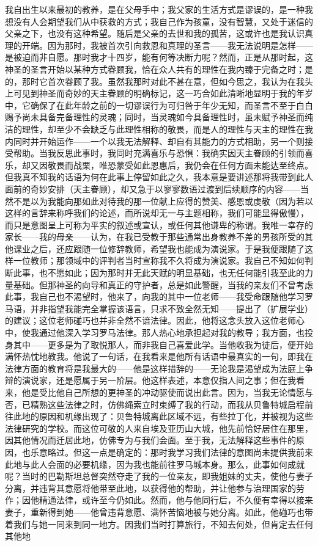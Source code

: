 我自出生以来最初的教养，是在父母手中；我父家的生活方式是谬误的，是一种我想没有人会期望我们从中获救的方式；我自己作为孩童，没有智慧，又处于迷信的父亲之下，也没有这种希望。随后是父亲的去世和我的孤苦，这或许也是我认识真理的开端。因为那时，我被首次引向救恩和真理的圣言——我无法说明是怎样——是被迫而非自愿。那时我才十四岁，能有何等决断力呢？然而，正是从那时起，这神圣的圣言开始以某种方式眷顾我，恰在众人共有的理性在我内臻于完备之时；是的，那时它首次眷顾了我。虽然我那时对此不甚在意，但如今思之，我认为在我头上可见到神圣而奇妙的天主眷顾的明确标记，这一巧合如此清晰地显明于我的年岁中，它确保了在此年龄之前的一切谬误行为可归咎于年少无知，而圣言不至于白白赐予尚未具备完备理性的灵魂；同时，当灵魂如今具备理性时，虽未赋予神圣而纯洁的理性，却至少不会缺乏与此理性相称的敬畏，而是人的理性与天主的理性在我内同时并开始运作——一个以我无法解释、却自有其能力的方式相助，另一个则接受帮助。当我反思此事时，我同时充满喜乐与恐惧：我确实因天主眷顾的引领而喜乐，却又因敬畏而战栗，唯恐蒙受如此恩惠后，我仍会在任何方面未能达至终点。但我真不知我的话语为何在此事上停留如此之久，我本意是要讲述那将我带到此人面前的奇妙安排（天主眷顾），却又急于以寥寥数语过渡到后续顺序的内容——当然不是以为我能向那如此对待我的那一位献上应得的赞美、感恩或虔敬（因为若以这样的言辞来称呼我们的论述，而所说却无一与主题相称，我们可能显得傲慢），而只是意图呈上可称为平实的叙述或宣认，或任何其他谦卑的称谓。我唯一幸存的家长——我的母亲——认为，在我已受教于那些通常出身教养不差的男孩所受的其他课业之后，还应跟随一位修辞教师，希望我也能成为演说家。于是我便跟随了这样一位教师；那领域中的评判者当时宣称我不久将成为演说家。我自己不知如何判断此事，也不愿如此；因为那时并无此天赋的明显基础，也无任何能引我至此的力量基础。但那神圣的向导和真正的守护者，总是如此警醒，当我的亲友们不曾考虑此事，我自己也不渴望时，他来了，向我的其中一位老师——我受命跟随他学习罗马语，并非指望我能完全掌握该语言，只求不致全然无知——提出了（扩展学业）的建议；这位老师碰巧也并非全然不谙法律。因此，他将这念头放入这位老师心中，使我通过他深入学习罗马法律。那人热心地承担起对我的教导；我方面，也投身其中——更多是为了取悦那人，而非我自己喜爱此学。当他收我为徒后，便开始满怀热忱地教我。他说了一句话，在我看来是他所有话语中最真实的一句，即我在法律方面的教育将是我最大的——他是这样措辞的——无论我是渴望成为法庭上争辩的演说家，还是愿属于另一阶层。他这样表述，本意仅指人间之事；但在我看来，他是受比他自己所想的更神圣的冲动驱使而说出此言。因为，当我无论情愿与否，已精熟这些法律之时，仿佛绳索立时束缚了我的行动，而我从贝鲁特城启程前往此地的原因和机缘出现了：贝鲁特城离此区域不远，有些拉丁化，并被视为这些法律研究的学校。而这位可敬的人来自埃及亚历山大城，他先前恰好居住在那里，因其他情况而迁居此地，仿佛专为与我们会面。至于我，无法解释这些事件的原因，也乐意略过。但这一点是确定的：那时我学习我们法律的意图尚未提供我前来此地与此人会面的必要机缘，因为我也能前往罗马城本身。那么，此事如何成就呢？当时的巴勒斯坦总督突然夺走了我的一位亲友，即我姐妹的丈夫，使他与妻子分离，并违背其意愿将他带至此地，以获得他的帮助，并让他参与治理国家的劳作；因他精通法律，或许至今仍如此。然而，他与他同行后，不久便有幸得以接来妻子，重新得到她——他曾违背意愿、满怀苦恼地被与她分离。如此，他碰巧也带着我们与她一同来到同一地方。因我们当时打算旅行，不知去何处，但肯定去任何其他地